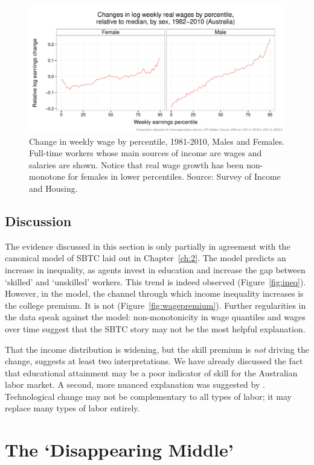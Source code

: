 \begin{figure}
  \centering
  \includegraphics[width=\textwidth]{../figure/quantile_mf.pdf}
  \caption{Change in weekly wage by percentile, 1981-2010, Males and Females. Full-time workers whose main sources of income are wages and salaries are shown. Notice that real wage growth has been non-monotone for females in lower percentiles. Source: Survey of Income and Housing.}
  \label{fig:banana}
\end{figure}

\subsection{Discussion}

The evidence discussed in this section is only partially in agreement with the canonical model of SBTC laid out in Chapter~\ref{ch:2}. The model predicts an increase in inequality, as agents invest in education and increase the gap between `skilled' and `unskilled' workers. This trend is indeed observed (Figure~\ref{fig:ineq}). However, in the model, the channel through which income inequality increases is the college premium. It is not (Figure~\ref{fig:wagepremium}). Further regularities in the data speak against the model: non-monotonicity in wage quantiles and wages over time suggest that the SBTC story may not be the most helpful explanation.

That the income distribution is widening, but the skill premium is {\em not} driving the change, suggests at least two interpretations. We have already discussed the fact that educational attainment may be a poor indicator of skill for the Australian labor market. A second, more nuanced explanation was suggested by \citet{Levy2003}. Technological change may not be complementary to all types of labor; it may replace many types of labor entirely.

\section{The `Disappearing Middle'}\label{sec:disappearing}

